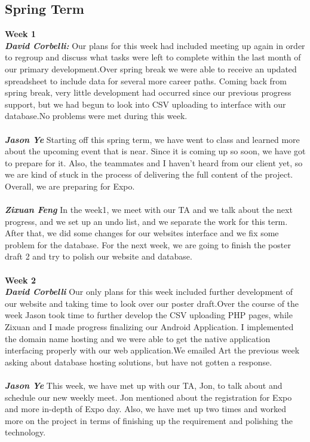 \documentclass[onecolumn, draftclsnofoot,10pt, compsoc]{IEEEtran}
\begin{document}
\subsection{Spring Term}
\textbf{Week 1}
\\ \textbf{\textit{David Corbelli:}}
\noindent Our plans for this week had included meeting up again in order to regroup and discuss what tasks were left to complete within the last month of our primary development.Over spring break we were able to receive an updated spreadsheet to include data for several more career paths. Coming back from spring break, very little development had occurred since our previous progress support, but we had begun to look into CSV uploading to interface with our database.No problems were met during this week.
\\ \\
\textbf{\textit{Jason Ye}}
Starting off this spring term, we have went to class and learned more about the upcoming event that is near. Since it is coming up so soon, we have got to prepare for it. Also, the teammates and I haven't heard from our client yet, so we are kind of stuck in the process of delivering the full content of the project. Overall, we are preparing for Expo.\\ \\
\textbf{\textit{Zixuan Feng}}
In the week1, we meet with our TA and we talk about the next progress, and we set up an undo list, and we separate the work for this term. After that, we did some changes for our websites interface and we fix some problem for the database. For the next week, we are going to finish the poster draft 2 and try to polish our website and database.\\ \\
\textbf{Week 2}
\\ \textbf{\textit{David Corbelli}}
Our only plans for this week included further development of our website and taking time to look over our poster draft.Over the course of the week Jason took time to further develop the CSV uploading PHP pages, while Zixuan and I made progress finalizing our Android Application. I implemented the domain name hosting and we were able to get the native application interfacing properly with our web application.We emailed Art the previous week asking about database hosting solutions, but have not gotten a response.\\ \\
\textbf{\textit{Jason Ye}}
This week, we have met up with our TA, Jon, to talk about and schedule our new weekly meet. Jon mentioned about the registration for Expo and more in-depth of Expo day. Also, we have met up two times and worked more on the project in terms of finishing up the requirement and polishing the technology.\\ \\
\end{document}
